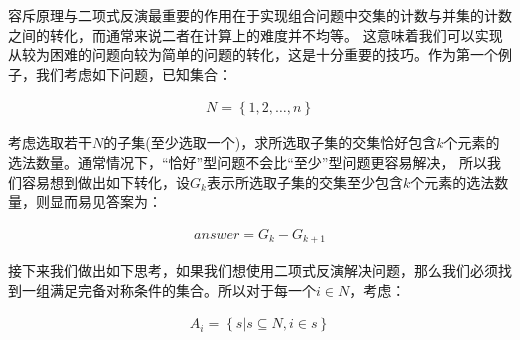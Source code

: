 \documentclass[UTF8]{book}
\begin{document}
容斥原理与二项式反演最重要的作用在于实现组合问题中交集的计数与并集的计数之间的转化，而通常来说二者在计算上的难度并不均等。
这意味着我们可以实现从较为困难的问题向较为简单的问题的转化，这是十分重要的技巧。作为第一个例子，我们考虑如下问题，已知集合：
\begin{large}
    \begin{equation}
        \begin{aligned}
            N=\left \{ 1,2,\dots,n \right \}
            \nonumber
        \end{aligned}
    \end{equation}
\end{large}
考虑选取若干$N$的子集(至少选取一个)，求所选取子集的交集恰好包含$k$个元素的选法数量。通常情况下，“恰好”型问题不会比“至少”型问题更容易解决，
所以我们容易想到做出如下转化，设$G_k$表示所选取子集的交集至少包含$k$个元素的选法数量，则显而易见答案为：
\begin{large}
    \begin{equation}
        \begin{aligned}
            answer=G_{k}-G_{k+1}
            \nonumber
        \end{aligned}
    \end{equation}
\end{large}
接下来我们做出如下思考，如果我们想使用二项式反演解决问题，那么我们必须找到一组满足完备对称条件的集合。所以对于每一个$i\in N$，考虑：
\begin{large}
    \begin{equation}
        \begin{aligned}
            A_i=\left \{ s|s \subseteq N,i \in s \right \}
            \nonumber
        \end{aligned}
    \end{equation}
\end{large}
\end{document}
